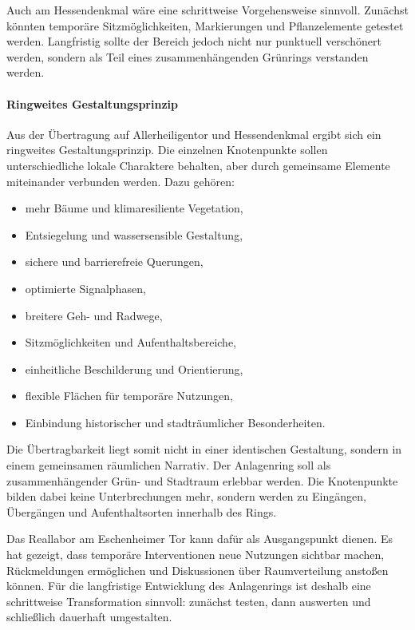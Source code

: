 \documentclass[a4paper,12pt]{article}
\begin{document}
Auch am Hessendenkmal wäre eine schrittweise Vorgehensweise sinnvoll. Zunächst könnten temporäre Sitzmöglichkeiten, Markierungen und Pflanzelemente getestet werden. Langfristig sollte der Bereich jedoch nicht nur punktuell verschönert werden, sondern als Teil eines zusammenhängenden Grünrings verstanden werden.

\paragraph{Ringweites Gestaltungsprinzip}

Aus der Übertragung auf Allerheiligentor und Hessendenkmal ergibt sich ein ringweites Gestaltungsprinzip. Die einzelnen Knotenpunkte sollen unterschiedliche lokale Charaktere behalten, aber durch gemeinsame Elemente miteinander verbunden werden. Dazu gehören:

\begin{itemize}
	\item mehr Bäume und klimaresiliente Vegetation,
	\item Entsiegelung und wassersensible Gestaltung,
	\item sichere und barrierefreie Querungen,
	\item optimierte Signalphasen,
	\item breitere Geh- und Radwege,
	\item Sitzmöglichkeiten und Aufenthaltsbereiche,
	\item einheitliche Beschilderung und Orientierung,
	\item flexible Flächen für temporäre Nutzungen,
	\item Einbindung historischer und stadträumlicher Besonderheiten.
\end{itemize}

Die Übertragbarkeit liegt somit nicht in einer identischen Gestaltung, sondern in einem gemeinsamen räumlichen Narrativ. Der Anlagenring soll als zusammenhängender Grün- und Stadtraum erlebbar werden. Die Knotenpunkte bilden dabei keine Unterbrechungen mehr, sondern werden zu Eingängen, Übergängen und Aufenthaltsorten innerhalb des Rings.

Das Reallabor am Eschenheimer Tor kann dafür als Ausgangspunkt dienen. Es hat gezeigt, dass temporäre Interventionen neue Nutzungen sichtbar machen, Rückmeldungen ermöglichen und Diskussionen über Raumverteilung anstoßen können. Für die langfristige Entwicklung des Anlagenrings ist deshalb eine schrittweise Transformation sinnvoll: zunächst testen, dann auswerten und schließlich dauerhaft umgestalten.
\end{document}
